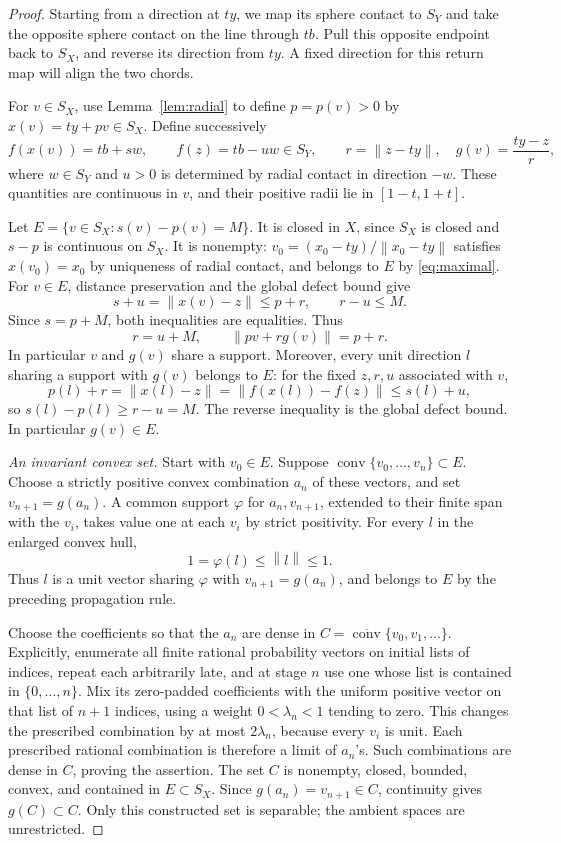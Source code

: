 \documentclass[11pt]{article}
\theoremstyle{remark}
\newcommand{\norm}[1]{\left\lVert#1\right\rVert}
\newcommand{\co}{\operatorname{conv}}
\newcommand{\clco}{\overline{\operatorname{conv}}}
\begin{document}
\begin{proof}
Starting from a direction at $ty$, we map its sphere contact to $S_Y$ and take the opposite sphere contact on the line through $tb$. Pull this opposite endpoint back to $S_X$, and reverse its direction from $ty$. A fixed direction for this return map will align the two chords.

For $v\in S_X$, use Lemma~\ref{lem:radial} to define $p=p(v)>0$ by $x(v)=ty+pv\in S_X$. Define successively
\begin{equation}\label{eq:return}
f(x(v))=tb+sw,\qquad f(z)=tb-uw\in S_Y,\qquad
r=\norm{z-ty},\quad g(v)=\frac{ty-z}{r},
\end{equation}
where $w\in S_Y$ and $u>0$ is determined by radial contact in direction $-w$. These quantities are continuous in $v$, and their positive radii lie in $[1-t,1+t]$.

Let $E=\{v\in S_X:s(v)-p(v)=M\}$. It is closed in $X$, since $S_X$ is closed and $s-p$ is continuous on $S_X$. It is nonempty: $v_0=(x_0-ty)/\norm{x_0-ty}$ satisfies $x(v_0)=x_0$ by uniqueness of radial contact, and belongs to $E$ by \eqref{eq:maximal}. For $v\in E$, distance preservation and the global defect bound give
\[
s+u=\norm{x(v)-z}\le p+r,\qquad r-u\le M.
\]
Since $s=p+M$, both inequalities are equalities. Thus
\begin{equation}\label{eq:equality}
r=u+M,\qquad \norm{pv+rg(v)}=p+r.
\end{equation}
In particular $v$ and $g(v)$ share a support. Moreover, every unit direction $l$ sharing a support with $g(v)$ belongs to $E$: for the fixed $z,r,u$ associated with $v$,
\[
p(l)+r=\norm{x(l)-z}
=\norm{f(x(l))-f(z)}\le s(l)+u,
\]
so $s(l)-p(l)\ge r-u=M$. The reverse inequality is the global defect bound. In particular $g(v)\in E$.

\smallskip\noindent\emph{An invariant convex set.}
Start with $v_0\in E$. Suppose $\co\{v_0,\ldots,v_n\}\subset E$. Choose a strictly positive convex combination $a_n$ of these vectors, and set $v_{n+1}=g(a_n)$. A common support $\varphi$ for $a_n,v_{n+1}$, extended to their finite span with the $v_i$, takes value one at each $v_i$ by strict positivity. For every $l$ in the enlarged convex hull,
\[
1=\varphi(l)\le\norm{l}\le1.
\]
Thus $l$ is a unit vector sharing $\varphi$ with $v_{n+1}=g(a_n)$, and belongs to $E$ by the preceding propagation rule.

Choose the coefficients so that the $a_n$ are dense in
$C=\clco\{v_0,v_1,\ldots\}$.
Explicitly, enumerate all finite rational probability vectors on initial lists of indices, repeat each arbitrarily late, and at stage $n$ use one whose list is contained in $\{0,\ldots,n\}$. Mix its zero-padded coefficients with the uniform positive vector on that list of $n+1$ indices, using a weight $0<\lambda_n<1$ tending to zero. This changes the prescribed combination by at most $2\lambda_n$, because every $v_i$ is unit. Each prescribed rational combination is therefore a limit of $a_n$'s. Such combinations are dense in $C$, proving the assertion. The set $C$ is nonempty, closed, bounded, convex, and contained in $E\subset S_X$. Since $g(a_n)=v_{n+1}\in C$, continuity gives $g(C)\subset C$. Only this constructed set is separable; the ambient spaces are unrestricted.


\end{proof}
\end{document}
